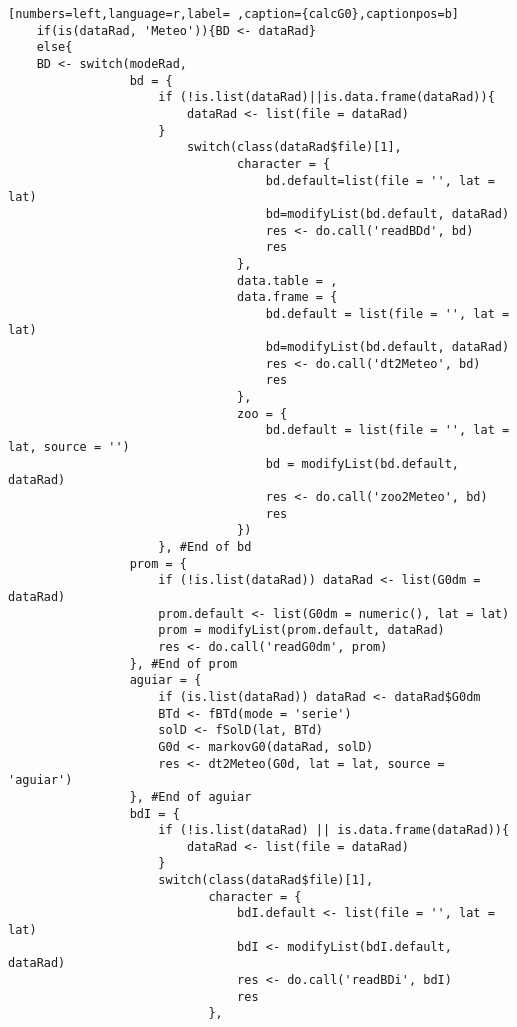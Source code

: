 \begin{lstlisting}[numbers=left,language=r,label= ,caption={calcG0},captionpos=b]
    if(is(dataRad, 'Meteo')){BD <- dataRad}
    else{
    BD <- switch(modeRad,
                 bd = {
                     if (!is.list(dataRad)||is.data.frame(dataRad)){
                         dataRad <- list(file = dataRad)
                     }
                         switch(class(dataRad$file)[1],
                                character = {
                                    bd.default=list(file = '', lat = lat)
                                    bd=modifyList(bd.default, dataRad)
                                    res <- do.call('readBDd', bd)
                                    res
                                },
                                data.table = ,
                                data.frame = {
                                    bd.default = list(file = '', lat = lat)
                                    bd=modifyList(bd.default, dataRad)
                                    res <- do.call('dt2Meteo', bd)
                                    res
                                },
                                zoo = {
                                    bd.default = list(file = '', lat = lat, source = '')
                                    bd = modifyList(bd.default, dataRad)
                                    res <- do.call('zoo2Meteo', bd)
                                    res
                                })
                     }, #End of bd
                 prom = {
                     if (!is.list(dataRad)) dataRad <- list(G0dm = dataRad)
                     prom.default <- list(G0dm = numeric(), lat = lat)
                     prom = modifyList(prom.default, dataRad)
                     res <- do.call('readG0dm', prom)
                 }, #End of prom
                 aguiar = {
                     if (is.list(dataRad)) dataRad <- dataRad$G0dm
                     BTd <- fBTd(mode = 'serie')
                     solD <- fSolD(lat, BTd)
                     G0d <- markovG0(dataRad, solD)
                     res <- dt2Meteo(G0d, lat = lat, source = 'aguiar')
                 }, #End of aguiar
                 bdI = {
                     if (!is.list(dataRad) || is.data.frame(dataRad)){
                         dataRad <- list(file = dataRad)
                     }
                     switch(class(dataRad$file)[1],
                            character = {
                                bdI.default <- list(file = '', lat = lat)
                                bdI <- modifyList(bdI.default, dataRad)
                                res <- do.call('readBDi', bdI)
                                res
                            },

\end{lstlisting}

